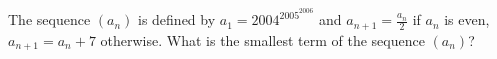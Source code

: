 The sequence $(a_n)$ is defined by $a_1 = 2004^{2005^{2006}}$ and $a_{n+1} = \frac{a_n}{2}$ if $a_n$ is even, $a_{n+1} = a_n + 7$ otherwise. What is the smallest term of the sequence $(a_n)$?

